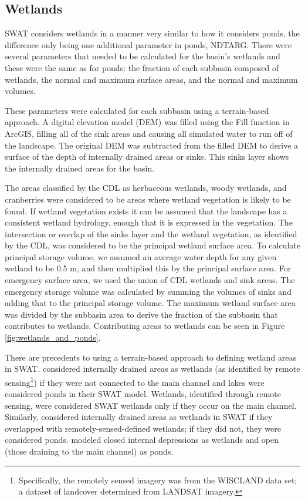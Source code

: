 \subsection{Wetlands}\label{sec:wetlands}

	SWAT considers wetlands in a manner very similar to how it considers ponds, the difference only being one additional parameter in ponds, NDTARG. There were several parameters that needed to be calculated for the basin's wetlands and these were the same as for ponds: the fraction of each subbasin composed of wetlands, the normal and maximum surface areas, and the normal and maximum volumes. 
	
	These parameters were calculated for each subbasin using a terrain-based approach. A digital elevation model (DEM) was filled using the Fill function in ArcGIS, filling all of the sink areas and causing all simulated water to run off of the landscape. The original DEM was subtracted from the filled DEM to derive a surface of the depth of internally drained areas or sinks.  This sinks layer shows the internally drained areas for the basin.
	
	The areas classified by the CDL as herbaceous wetlands, woody wetlands, and cranberries were considered to be areas where wetland vegetation is likely to be found. If wetland vegetation exists it can be assumed that the landscape has a consistent wetland hydrology, enough that it is expressed in the vegetation. The intersection or overlap of the sinks layer and the wetland vegetation, as identified by the CDL, was considered to be the principal wetland surface area. To calculate principal storage volume, we assumed an average water depth for any given wetland to be 0.5 m, and then multiplied this by the principal surface area. For emergency surface area, we used the union of CDL wetlands and sink areas. The emergency storage volume was calculated by summing the volumes of sinks and adding that to the principal storage volume. The maximum wetland surface area was divided by the subbasin area to derive the fraction of the subbasin that contributes to wetlands. Contributing areas to wetlands can be seen in Figure \ref{fig:wetlands_and_ponds}.

	There are precedents to using a terrain-based approach to defining wetland areas in SWAT. \citet{almendinger_constructing_2007} considered internally drained areas as wetlands (as identified by remote sensing\footnote{Specifically, the remotely sensed imagery was from the WISCLAND data set; a dataset of landcover determined from LANDSAT imagery.}) if they were not connected to the main channel and lakes were considered ponds in their SWAT model. Wetlands, identified through remote sensing, were considered SWAT wetlands only if they occur on the main channel. Similarly, \citet{kirsch_predicting_2002} considered internally drained areas as wetlands in SWAT if they overlapped with remotely-sensed-defined wetlands; if they did not, they were considered ponds.  \citet{almendinger_constructing_2010} modeled closed internal depressions as wetlands and open (those draining to the main channel) as ponds.



